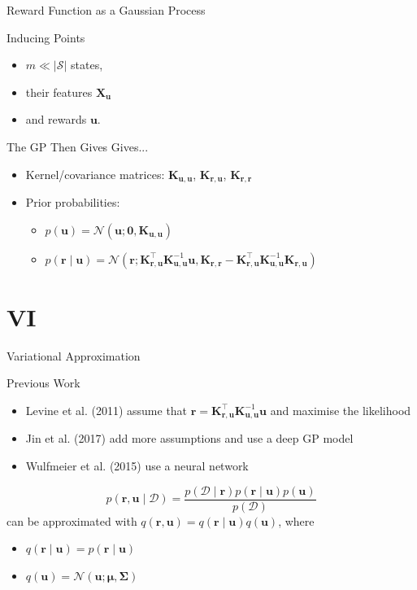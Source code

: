 \documentclass{beamer}
\newcommand{\Kuu}{\mathbf{K}_{\mathbf{u},\mathbf{u}}}
\newcommand{\Krr}{\mathbf{K}_{\mathbf{r},\mathbf{r}}}
\newcommand{\Kru}{\mathbf{K}_{\mathbf{r},\mathbf{u}}}
\begin{document}
\begin{frame}{Reward Function as a Gaussian Process}
    \begin{block}{Inducing Points}
      \begin{itemize}
      \item $m \ll |\mathcal{S}|$ states,
      \item their features $\mathbf{X_u}$
      \item and rewards $\mathbf{u}$.
      \end{itemize}
    \end{block}

  \begin{block}{The GP Then Gives Gives...}
    \begin{itemize}
    \item Kernel/covariance matrices: $\Kuu$, $\Kru$, $\Krr$
    \item Prior probabilities:
      \begin{itemize}
      \item $p(\mathbf{u}) = \mathcal{N}(\mathbf{u}; \mathbf{0}, \Kuu)$
      \item $p(\mathbf{r} \mid \mathbf{u}) = \mathcal{N}(\mathbf{r};
        \Kru^\intercal\Kuu^{-1}\mathbf{u}, \Krr - \Kru^\intercal\Kuu^{-1}\Kru)$
      \end{itemize}
    \end{itemize}
  \end{block}
\end{frame}

\section{VI}

\begin{frame}{Variational Approximation}
  \begin{block}{Previous Work}
    \begin{itemize}
    \item Levine et al. (2011) assume that $\mathbf{r} =
      \Kru^\intercal\Kuu^{-1}\mathbf{u}$ and maximise the likelihood
    \item Jin et al. (2017) add more assumptions and use a deep GP model
    \item Wulfmeier et al. (2015) use a neural network
    \end{itemize}
  \end{block}
  \[
    p(\mathbf{r}, \mathbf{u} \mid \mathcal{D}) = \frac{p(\mathcal{D} \mid
      \mathbf{r})p(\mathbf{r} \mid \mathbf{u})p(\mathbf{u})}{p(\mathcal{D})}
  \]
  can be approximated with $q(\mathbf{r}, \mathbf{u}) = q(\mathbf{r} \mid
  \mathbf{u})q(\mathbf{u})$, where
  \begin{itemize}
  \item $q(\mathbf{r} \mid \mathbf{u}) = p(\mathbf{r} \mid \mathbf{u})$
  \item $q(\mathbf{u}) = \mathcal{N}(\mathbf{u}; \bm\mu, \bm\Sigma)$
  \end{itemize}
\end{frame}
\end{document}
